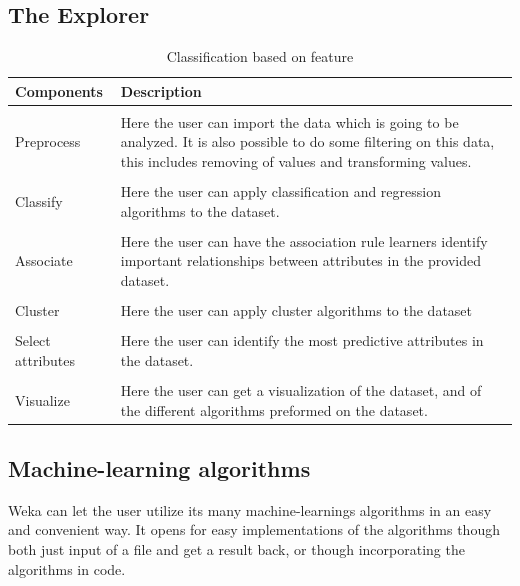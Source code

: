 \subsection{The Explorer}
\begin{table}[H]
\centering
\begin{tabularx}{1.0\textwidth}{ l p{9.3cm} }
  \textbf{Components} & \textbf{Description} \\
  \hline \\ [-1.5ex]
  Preprocess & Here the user can import the data which is going to be analyzed. It is also possible to do some filtering on this data, this includes removing of values and transforming values. \\
  \hline \\ [-1.5ex]
  Classify & Here the user can apply classification and regression algorithms to the dataset. \\
  \hline \\ [-1.5ex]
  Associate & Here the user can have the association rule learners identify important relationships between attributes in the provided dataset. \\
  \hline \\ [-1.5ex]
  Cluster & Here the user can apply cluster algorithms to the dataset \\
  \hline \\ [-1.5ex]
  Select attributes & Here the user can identify the most predictive attributes in the dataset. \\
  \hline \\ [-1.5ex]
  Visualize & Here the user can get a visualization of the dataset, and of the different algorithms preformed on the dataset. \\
\end{tabularx}
\caption{Classification based on feature}
\label{table:nosql-calssifications}
\end{table}

\subsection{Machine-learning algorithms}
Weka can let the user utilize its many machine-learnings algorithms in an easy and convenient way. It opens for easy implementations of the algorithms though both just input of a file and get a result back, or though incorporating the algorithms in code.





